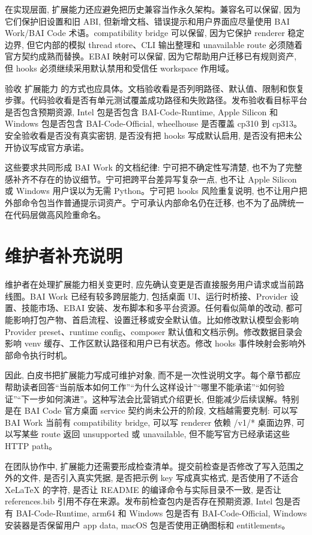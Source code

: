 在实现层面, 扩展能力还应避免把历史兼容当作永久架构。兼容名可以保留, 因为它们保护旧设置和旧 ABI, 但新增文档、错误提示和用户界面应尽量使用 BAI Work/BAI Code 术语。compatibility bridge 可以保留, 因为它保护 renderer 稳定边界, 但它内部的模拟 thread store、CLI 输出整理和 unavailable route 必须随着官方契约成熟而替换。EBAI 映射可以保留, 因为它帮助用户迁移已有规则资产, 但 hooks 必须继续采用默认禁用和受信任 workspace 作用域。

验收 扩展能力 的方式也应具体。文档验收看是否列明路径、默认值、限制和恢复步骤。代码验收看是否有单元测试覆盖成功路径和失败路径。发布验收看目标平台是否包含预期资源, Intel 包是否包含 BAI-Code-Runtime, Apple Silicon 和 Windows 包是否包含 BAI-Code-Official, wheelhouse 是否覆盖 cp310 到 cp313。安全验收看是否没有真实密钥, 是否没有把 hooks 写成默认启用, 是否没有把未公开协议写成官方承诺。

这些要求共同形成 BAI Work 的文档纪律: 宁可把不确定性写清楚, 也不为了完整感补齐不存在的协议细节。宁可把跨平台差异写复杂一点, 也不让 Apple Silicon 或 Windows 用户误以为无需 Python。宁可把 hooks 风险重复说明, 也不让用户把外部命令包当作普通提示词资产。宁可承认内部命名仍在迁移, 也不为了品牌统一在代码层做高风险重命名。

\section{维护者补充说明}

维护者在处理扩展能力相关变更时, 应先确认变更是否直接服务用户请求或当前路线图。BAI Work 已经有较多跨层能力, 包括桌面 UI、运行时桥接、Provider 设置、技能市场、EBAI 安装、发布脚本和多平台资源。任何看似简单的改动, 都可能影响打包产物、首启流程、设置迁移或安全默认值。比如修改默认模型会影响 Provider preset、runtime config、composer 默认值和文档示例。修改数据目录会影响 venv 缓存、工作区默认路径和用户已有状态。修改 hooks 事件映射会影响外部命令执行时机。

因此, 白皮书把扩展能力写成可维护对象, 而不是一次性说明文字。每个章节都应帮助读者回答“当前版本如何工作”“为什么这样设计”“哪里不能承诺”“如何验证”“下一步如何演进”。这种写法会比营销式介绍更长, 但能减少后续误解。特别是在 BAI Code 官方桌面 service 契约尚未公开的阶段, 文档越需要克制: 可以写 BAI Work 当前有 compatibility bridge, 可以写 renderer 依赖 /v1/* 桌面边界, 可以写某些 route 返回 unsupported 或 unavailable, 但不能写官方已经承诺这些 HTTP path。

在团队协作中, 扩展能力还需要形成检查清单。提交前检查是否修改了写入范围之外的文件, 是否引入真实凭据, 是否把示例 key 写成真实格式, 是否使用了不适合 XeLaTeX 的字符, 是否让 README 的编译命令与实际目录不一致, 是否让 references.bib 引用不存在来源。发布前检查包内是否存在预期资源, Intel 包是否有 BAI-Code-Runtime, arm64 和 Windows 包是否有 BAI-Code-Official, Windows 安装器是否保留用户 app data, macOS 包是否使用正确图标和 entitlements。

